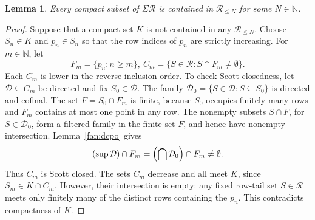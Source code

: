 \documentclass[fleqn,preprint,3p,a4paper]{elsarticle}
\newtheorem{lemma}[theorem]{Lemma}
\theoremstyle{definition}
\newcommand{\N}{\mathbb N}
\newcommand{\RR}{\mathcal R}
\begin{document}
\begin{lemma}\label{fan:compact-rows}
Every compact subset of $\Sigma\RR$ is contained in $\RR_{\leq N}$ for some $N\in\N$.
\end{lemma}
\begin{proof}
Suppose that a compact set $K$ is not contained in any $\RR_{\leq N}$. Choose $S_n\in K$ and $p_n\in S_n$ so that the row indices of $p_n$ are strictly increasing. For $m\in\N$, let
\[
 F_m=\{p_n:n\geq m\},
 ~
 C_m=\{S\in\RR:S\cap F_m\ne\emptyset\}.
\]
Each $C_m$ is lower in the reverse-inclusion order. To check Scott closedness, let $\mathcal D\subseteq C_m$ be directed and fix $S_0\in\mathcal D$. The family $\mathcal D_0=\{S\in\mathcal D:S\subseteq S_0\}$ is directed and cofinal. The set $F=S_0\cap F_m$ is finite, because $S_0$ occupies finitely many rows and $F_m$ contains at most one point in any row. The nonempty subsets $S\cap F$, for $S\in\mathcal D_0$, form a filtered family in the finite set $F$, and hence have nonempty intersection. Lemma~\ref{fan:dcpo} gives
\[
 (\sup\mathcal D)\cap F_m
 =\Bigl(\bigcap\mathcal D_0\Bigr)\cap F_m\ne\emptyset.
\]
Thus $C_m$ is Scott closed. The sets $C_m$ decrease and all meet $K$, since $S_m\in K\cap C_m$. However, their intersection is empty: any fixed row-tail set $S\in\RR$ meets only finitely many of the distinct rows containing the $p_n$. This contradicts compactness of $K$.
\end{proof}
\end{document}

